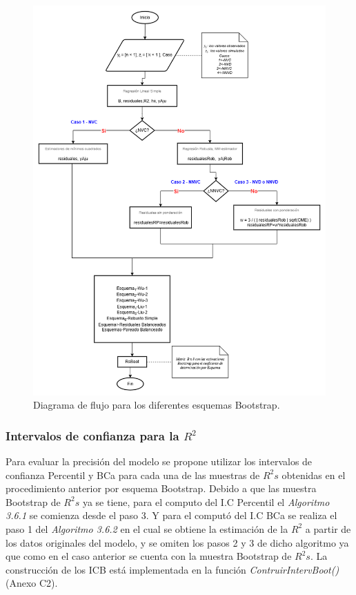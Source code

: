 \begin{figure}[ht!]
	\centering 
	\includegraphics[width=0.7\linewidth]{img/metodologia_v7.png} 
	\caption{Diagrama de flujo para los diferentes esquemas Bootstrap.}
	\label{fig:AlgDifEsqBoots}
\end{figure}
\FloatBarrier

\subsubsection{Intervalos de confianza para la $R^{2}$}

Para evaluar la precisión del modelo se propone utilizar los intervalos de confianza Percentil y BCa para cada una de las muestras de $R^{2}s$ obtenidas en el procedimiento anterior por esquema Bootstrap. Debido a que las muestra Bootstrap de $R^{2}s$ ya se tiene, para el computo del I.C Percentil el \textit{Algoritmo 3.6.1} se comienza desde el paso 3. Y para el computó del I.C BCa se realiza el paso 1 del \textit{Algoritmo 3.6.2} en el cual se obtiene la estimación de la $R^{2}$ a partir de los datos originales del modelo, y se omiten los pasos 2 y 3 de dicho algoritmo ya que como en el caso anterior se cuenta con la muestra Bootstrap de $R^2 s$. La construcción de los ICB está implementada en la función \textit{ContruirIntervBoot()} (Anexo C2). \\



